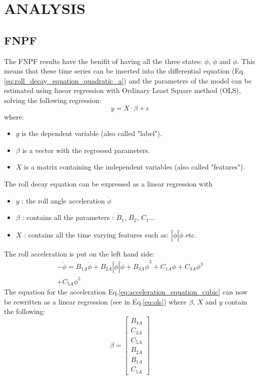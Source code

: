 \section*{ANALYSIS}\label{analysis}
\subsection*{FNPF}\label{fnpf}
The FNPF results have the benifit of having all the three states:
$\phi$, $\dot{\phi}$ and $\ddot{\phi}$. This means that these time
series can be inserted into the differential equation
(Eq.\ref{eq:roll_decay_equation_quadratic_a}) and the parameters
of the model can be estimated using linear regression with Ordinary
Least Square method (OLS), solving the following regression:
\begin{equation}
y = X \cdot \beta + \epsilon
\label{eq:ols}
\end{equation}
where:
\begin{itemize}
\item $y$ is the dependent variable (also called "label").
\item $\beta$ is a vector with the regressed parameters.
\item $X$ is a matrix containing the independent variables (also called "features").
\end{itemize}
The roll decay equation can be expressed as a linear regression with
\begin{itemize}
\item $y$ : the roll angle acceleration $\ddot{\phi}$
\item $\beta$ : contains all the parameters : $B_1$, $B_2$, $C_1$...
\item $X$ : contains all the time varying features such as: $| \dot{\phi} | \dot{\phi} $ etc.
\end{itemize}
The roll acceleration is put on the left hand side:
\begin{equation}
\begin{aligned}
- \ddot{\phi} = B_{1A} \dot{\phi} + B_{2A} \left|{\dot{\phi}}\right| \dot{\phi} + B_{3A} \dot{\phi}^{3} + C_{1A} \phi + C_{3A} \phi^{3} \\ + C_{5A} \phi^{5}
\end{aligned}
\label{eq:acceleration_equation_cubic}
\end{equation}
The equation for the acceleration
Eq.\ref{eq:acceleration_equation_cubic} can now be rewritten as
a linear regression (see in Eq.\ref{eq:ols}) where $\beta$,
$X$ and $y$ contain the following:
\begin{equation}
\beta = \left[\begin{matrix}B_{3A}\\C_{3A}\\C_{5A}\\B_{2A}\\B_{1A}\\C_{1A}\end{matrix}\right]
\label{eq:eq_beta}
\end{equation}
